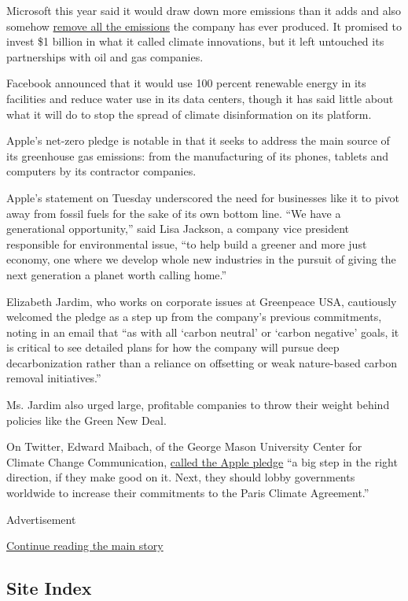 Microsoft this year said it would draw down more emissions than it adds
and also somehow
\href{https://www.nytimes3xbfgragh.onion/aponline/2020/01/16/business/bc-us-microsoft-climate-pledge.html}{remove
all the emissions} the company has ever produced. It promised to invest
\$1 billion in what it called climate innovations, but it left untouched
its partnerships with oil and gas companies.

Facebook announced that it would use 100 percent renewable energy in its
facilities and reduce water use in its data centers, though it has said
little about what it will do to stop the spread of climate
disinformation on its platform.

Apple's net-zero pledge is notable in that it seeks to address the main
source of its greenhouse gas emissions: from the manufacturing of its
phones, tablets and computers by its contractor companies.

Apple's statement on Tuesday underscored the need for businesses like it
to pivot away from fossil fuels for the sake of its own bottom line.
``We have a generational opportunity,'' said Lisa Jackson, a company
vice president responsible for environmental issue, ``to help build a
greener and more just economy, one where we develop whole new industries
in the pursuit of giving the next generation a planet worth calling
home.''

Elizabeth Jardim, who works on corporate issues at Greenpeace USA,
cautiously welcomed the pledge as a step up from the company's previous
commitments, noting in an email that ``as with all `carbon neutral' or
`carbon negative' goals, it is critical to see detailed plans for how
the company will pursue deep decarbonization rather than a reliance on
offsetting or weak nature-based carbon removal initiatives.''

Ms. Jardim also urged large, profitable companies to throw their weight
behind policies like the Green New Deal.

On Twitter, Edward Maibach, of the George Mason University Center for
Climate Change Communication,
\href{https://twitter.com/MaibachEd/status/1285571592832131074}{called
the Apple pledge} ``a big step in the right direction, if they make good
on it. Next, they should lobby governments worldwide to increase their
commitments to the Paris Climate Agreement.''

Advertisement

\protect\hyperlink{after-bottom}{Continue reading the main story}

\hypertarget{site-index}{%
\subsection{Site Index}\label{site-index}}

